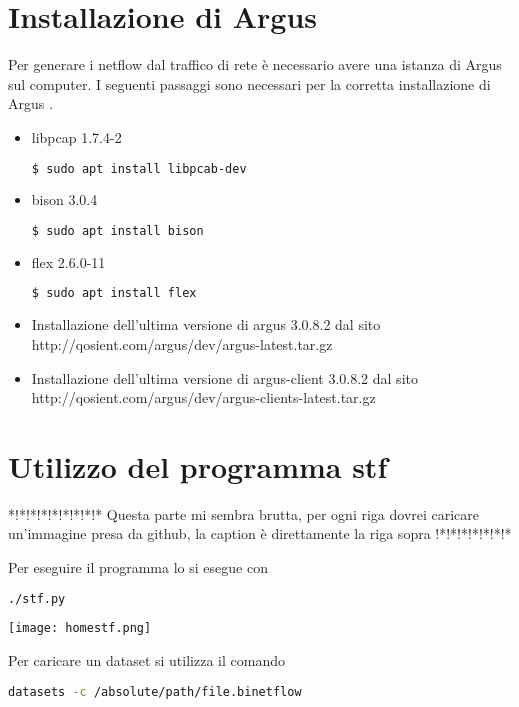 \documentclass[../main.tex]{subfiles}
\begin{document}
\section{Installazione di Argus}

Per generare i netflow dal traffico di rete è necessario avere una istanza di Argus sul computer. I seguenti passaggi sono necessari per la corretta installazione di Argus \cite{stf}.

\begin{itemize}
				\item libpcap 1.7.4-2
\begin{lstlisting}[language=bash]
$ sudo apt install libpcab-dev
\end{lstlisting}

\item bison 3.0.4
\begin{lstlisting}[language=bash]
$ sudo apt install bison
\end{lstlisting}

\item flex 2.6.0-11
\begin{lstlisting}[language=bash]
$ sudo apt install flex
\end{lstlisting}

\item Installazione dell'ultima versione di argus 3.0.8.2 dal sito http://qosient.com/argus/dev/argus-latest.tar.gz

\item Installazione dell'ultima versione di argus-client 3.0.8.2 dal sito http://qosient.com/argus/dev/argus-clients-latest.tar.gz

\end{itemize}
\section{Utilizzo del programma stf\\}
*!*!*!*!*!*!*!*!* Questa parte mi sembra brutta, per ogni riga dovrei caricare un'immagine presa da github, la caption è direttamente la riga sopra !*!*!*!*!*!*!*\newline

Per eseguire il programma lo si esegue con
\begin{lstlisting}[language=bash]
	./stf.py
\end{lstlisting}
\texttt{[image: homestf.png]}

Per caricare un dataset si utilizza il comando
\begin{lstlisting}[language=bash]
	datasets -c /absolute/path/file.binetflow	
\end{lstlisting}
\end{document}
